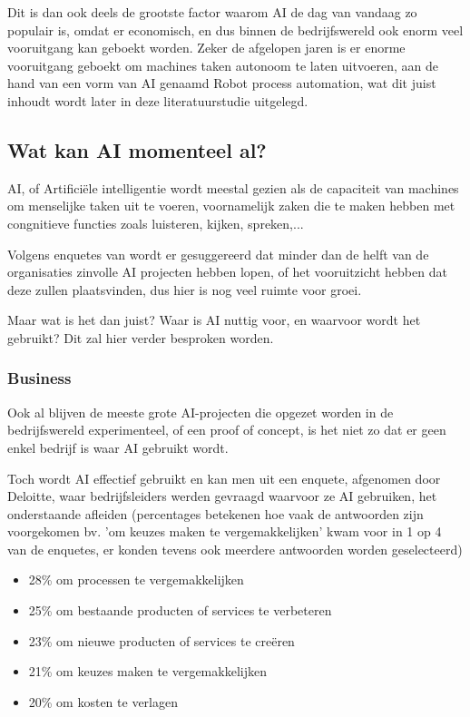 Dit is dan ook deels de grootste factor waarom AI de dag van vandaag zo populair is, omdat er economisch, en dus binnen de bedrijfswereld ook enorm veel vooruitgang kan geboekt worden. Zeker de afgelopen jaren is er enorme vooruitgang geboekt om machines taken autonoom te laten uitvoeren, aan de hand van een vorm van AI genaamd Robot process automation, wat dit juist inhoudt wordt later in deze literatuurstudie uitgelegd.

\subsection{Wat kan AI momenteel al?}

AI, of Artificiële intelligentie wordt meestal gezien als de capaciteit van machines om menselijke taken uit te voeren, voornamelijk zaken die te maken hebben met congnitieve functies zoals luisteren, kijken, spreken,... 

Volgens enquetes van \cite{benbya2020artificial} wordt er gesuggereerd dat minder dan de helft van de organisaties zinvolle AI projecten hebben lopen, of het vooruitzicht hebben dat deze zullen plaatsvinden, dus hier is nog veel ruimte voor groei. 

Maar wat is het dan juist? Waar is AI nuttig voor, en waarvoor wordt het gebruikt? Dit zal hier verder besproken worden.

\subsubsection{Business}
Ook al blijven de meeste grote AI-projecten die opgezet worden in de bedrijfswereld experimenteel, of een proof of concept, is het niet zo dat er geen enkel bedrijf is waar AI gebruikt wordt. 

Toch wordt AI effectief gebruikt en kan men uit een enquete, afgenomen door Deloitte, waar bedrijfsleiders werden gevraagd waarvoor ze AI gebruiken, het onderstaande afleiden (percentages betekenen hoe vaak de antwoorden zijn voorgekomen bv. 'om keuzes maken te vergemakkelijken' kwam voor in 1 op 4 van de enquetes, er konden tevens ook meerdere antwoorden worden geselecteerd)

\begin{itemize}
    \item 28\% om processen te vergemakkelijken
    \item 25\% om bestaande producten of services te verbeteren
    \item 23\% om nieuwe producten of services te creëren
    \item 21\% om keuzes maken te vergemakkelijken
    \item 20\% om kosten te verlagen
\end{itemize}

